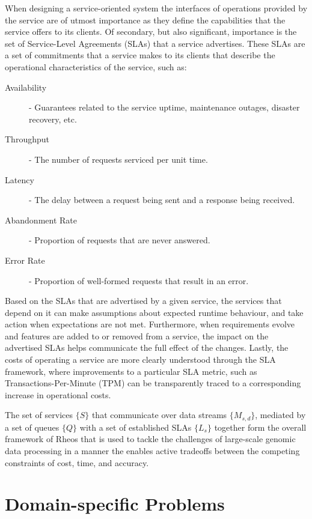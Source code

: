 When designing a service-oriented system the interfaces of operations provided by the service are of utmost importance as they define the capabilities that the service offers to its clients. Of secondary, but also significant, importance is the set of Service-Level Agreements (SLAs)\autocite{wieder2011service} that a service advertises. These SLAs are a set of commitments that a service makes to its clients that describe the operational characteristics of the service, such as:

\begin{description}
    \item [Availability] - Guarantees related to the service uptime, maintenance outages, disaster recovery, etc.
    \item [Throughput] - The number of requests serviced per unit time.
    \item [Latency] - The delay between a request being sent and a response being received.
    \item [Abandonment Rate] - Proportion of requests that are never answered.
    \item [Error Rate] - Proportion of well-formed requests that result in an error.
\end{description}

Based on the SLAs that are advertised by a given service, the services that depend on it can make assumptions about expected runtime behaviour, and take action when expectations are not met. Furthermore, when requirements evolve and features are added to or removed from a service, the impact on the advertised SLAs helps communicate the full effect of the changes. Lastly, the costs of operating a service are more clearly understood through the SLA framework, where improvements to a particular SLA metric, such as Transactions-Per-Minute (TPM) can be transparently traced to a corresponding increase in operational costs.

The set of services $\{S\}$ that communicate over data streams $\{M_{s,d}\}$, mediated by a set of queues $\{Q\}$ with a set of established SLAs $\{L_s\}$ together form the overall framework of Rheos that is used to tackle the challenges of large-scale genomic data processing in a manner the enables active tradeoffs between the competing constraints of cost, time, and accuracy. 

\section{Domain-specific Problems}\label{sec:rheos_domain_specific_problems}

